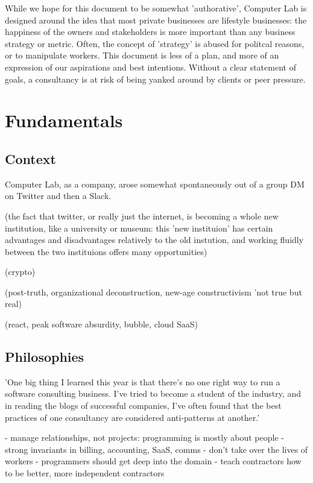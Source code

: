 \documentclass[12pt]{article}
\begin{document}
While we hope for this document to be somewhat 'authorative', Computer Lab is
designed around the idea that most private businesses are lifestyle businesses:
the happiness of the owners and stakeholders is more important than any business
strategy or metric.  Often, the concept of 'strategy' is abused for politcal
reasons, or to manipulate workers.  This document is less of a plan, and more of
an expression of our aspirations and best intentions.  Without a clear statement
of goals, a consultancy is at risk of being yanked around by clients or peer
pressure.

\section{Fundamentals}
\subsection{Context}

Computer Lab, as a company, arose somewhat spontaneously out of a group DM on
Twitter and then a Slack.

(the fact that twitter, or really just the internet, is becoming a whole new
institution, like a university or museum: this 'new instituion' has  certain advantages and
disadvantages relatively to the old instution, and working fluidly between the
two instituions offers many opportunities)

(crypto)

(post-truth, organizational deconstruction, new-age constructivism 'not true but
real)

(react, peak software absurdity, bubble, cloud SaaS)

\subsection{Philosophies}

'One big thing I learned this year is that there's no one right way to run a
software consulting business. I've tried to become a student of the industry,
and in reading the blogs of successful companies, I've often found that the best
practices of one consultancy are considered anti-patterns at another.'

- manage relationships, not projects: programming is mostly about people
- strong invariants in billing, accounting, SaaS, comms
- don't take over the lives of workers
- programmers should get deep into the domain
- teach contractors how to be better, more independent contractors
\end{document}
